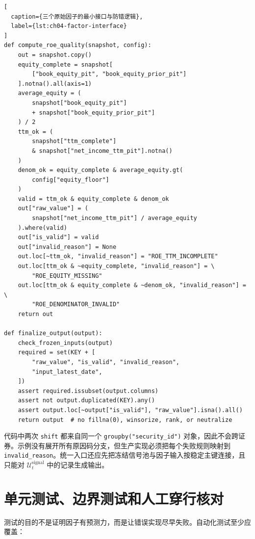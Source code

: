\begin{lstlisting}[
  caption={三个原始因子的最小接口与防错逻辑},
  label={lst:ch04-factor-interface}
]
def compute_roe_quality(snapshot, config):
    out = snapshot.copy()
    equity_complete = snapshot[
        ["book_equity_pit", "book_equity_prior_pit"]
    ].notna().all(axis=1)
    average_equity = (
        snapshot["book_equity_pit"]
        + snapshot["book_equity_prior_pit"]
    ) / 2
    ttm_ok = (
        snapshot["ttm_complete"]
        & snapshot["net_income_ttm_pit"].notna()
    )
    denom_ok = equity_complete & average_equity.gt(
        config["equity_floor"]
    )
    valid = ttm_ok & equity_complete & denom_ok
    out["raw_value"] = (
        snapshot["net_income_ttm_pit"] / average_equity
    ).where(valid)
    out["is_valid"] = valid
    out["invalid_reason"] = None
    out.loc[~ttm_ok, "invalid_reason"] = "ROE_TTM_INCOMPLETE"
    out.loc[ttm_ok & ~equity_complete, "invalid_reason"] = \
        "ROE_EQUITY_MISSING"
    out.loc[ttm_ok & equity_complete & ~denom_ok, "invalid_reason"] = \
        "ROE_DENOMINATOR_INVALID"
    return out

def finalize_output(output):
    check_frozen_inputs(output)
    required = set(KEY + [
        "raw_value", "is_valid", "invalid_reason",
        "input_latest_date",
    ])
    assert required.issubset(output.columns)
    assert not output.duplicated(KEY).any()
    assert output.loc[~output["is_valid"], "raw_value"].isna().all()
    return output  # no fillna(0), winsorize, rank, or neutralize
\end{lstlisting}

代码中两次 \texttt{shift} 都来自同一个
\texttt{groupby("security\_id")} 对象，因此不会跨证券。示例没有展开所有原因码分支，但生产实现必须把每个失败规则映射到
\texttt{invalid\_reason}。统一入口还应先把冻结信号池与因子输入按稳定主键连接，且只能对
\(\mathcal{U}^{\mathrm{signal}}_t\) 中的记录生成输出。

\section{单元测试、边界测试和人工穿行核对}

测试的目的不是证明因子有预测力，而是让错误实现尽早失败。自动化测试至少应覆盖：

